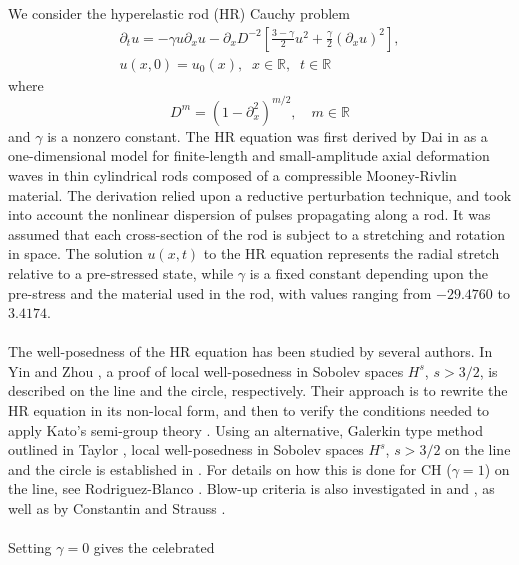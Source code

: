 \documentclass[a0,portrait]{a0poster}
\newcommand{\rr}{\mathbb{R}}
\newcommand{\p}{\partial}
\begin{document}
\begin{multicols}{3}
We consider the hyperelastic rod (HR) Cauchy problem
\begin{gather}
 \p_t u =  -\gamma u \p_x u -
 \p_{x} D^{-2} \left[ \frac{3-\gamma}{2}u^2 +
\frac{\gamma}{2} \left( \p_x u \right)^2
\right],
\label{hyperelastic-rod-equation}
\\
 u(x,0) = u_0(x), \; \; x \in \rr, \; \; t \in \rr
\label{init-cond}
\end{gather}
%
%
where 
\begin{equation*}
	D^{m} = (1 - \p_x^2)^{m/2}, \quad m \in \rr
\end{equation*}
and  $\gamma$  is a  nonzero constant. The HR equation was first
derived by Dai in \cite{Dai_1998_Model-equations} as a one-dimensional 
model for finite-length and
small-amplitude axial deformation waves in thin cylindrical
rods composed of a compressible Mooney-Rivlin
material. The derivation relied upon a reductive perturbation technique, 
and took into account the nonlinear dispersion of pulses propagating 
along a rod. It was assumed that each cross-section of the rod is 
subject to a stretching and rotation in space. The solution $u(x,t)$ to the 
HR equation represents the radial stretch relative
to a pre-stressed state, while $\gamma$ is a fixed constant depending upon 
the pre-stress and the material used in
the rod, with values ranging from $- 29.4760$ to $3.4174$.
%
\\
\\
The well-posedness of the HR equation has been studied by several authors. 
In Yin \cite{Yin_2003_On-the-Cauchy-p} and Zhou 
\cite{Zhou_2005_Local-well-pose}, a proof of local well-posedness in Sobolev 
spaces $H^s$,  $s > 3/2$, is described  on the line and the circle, respectively. 
Their approach is to rewrite the HR equation   
in its non-local form, and then to verify the conditions needed to apply 
Kato's semi-group theory \cite{Kato_1975_Quasi-linear-eq}. Using an alternative,
Galerkin type method outlined in Taylor \cite{Taylor_1991_Pseudodifferent}, local
well-posedness in Sobolev spaces $H^s$,  $s > 3/2$ on the line and the circle is
established in \cite{Karapetyan:2010fk}. 
For details on how this is done for CH ($\gamma =1$) on the line, see Rodriguez-Blanco 
\cite{Rodriguez-Blanco_2001_On-the-Cauchy-p}. Blow-up criteria 
is also investigated in \cite{Yin_2003_On-the-Cauchy-p} and 
\cite{Zhou_2005_Local-well-pose}, as well as by Constantin and Strauss 
\cite{Constantin_2000_Stability-of-a-}. 
\\
\\
Setting $\gamma = 0$ gives the celebrated 

\end{multicols}
\end{document}
